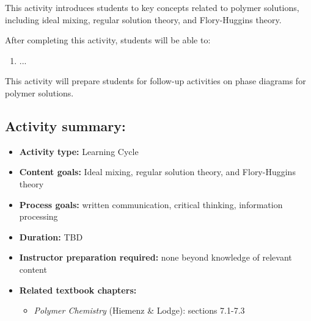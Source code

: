 %
%
%
%

\renewcommand{\figpath}{content/polymphys/solution-thermo/flory-huggins/figs}

\begin{activity}

\begin{instructornotes}

	This activity introduces students to key concepts related to polymer solutions, including ideal mixing, regular solution theory, and Flory-Huggins theory.
	
	After completing this activity, students will be able to:
			\begin{enumerate}
				\item ...
			\end{enumerate}
	This activity will prepare students for follow-up activities on phase diagrams for polymer solutions.
			
	\subsection*{Activity summary:}
	\begin{itemize}
		\item \textbf{Activity type:} Learning Cycle
		\item \textbf{Content goals:} Ideal mixing, regular solution theory, and Flory-Huggins theory
		\item \textbf{Process goals:} %
			written communication, critical thinking, information processing
		\item \textbf{Duration:} TBD
		\item \textbf{Instructor preparation required:} none beyond knowledge of relevant content
		\item \textbf{Related textbook chapters:}
			\begin{itemize}
				\item \emph{Polymer Chemistry} (Hiemenz \& Lodge): sections 7.1-7.3
		\end{itemize}
	\end{itemize}


\end{instructornotes}
\end{activity}
